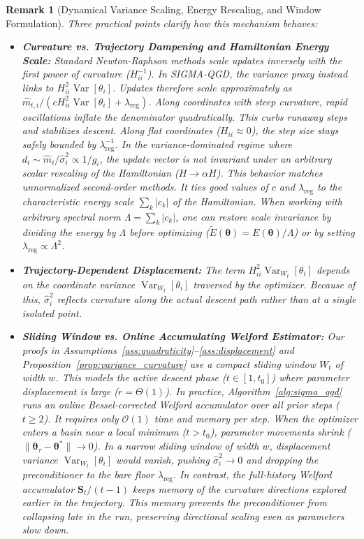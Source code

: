 \documentclass[11pt,a4paper]{article}
\newtheorem{remark}{Remark}
\begin{document}
\begin{remark}[Dynamical Variance Scaling, Energy Rescaling, and Window Formulation]
\label{rem:variance_scaling}
Three practical points clarify how this mechanism behaves:
\begin{itemize}
    \item \textbf{Curvature vs. Trajectory Dampening and Hamiltonian Energy Scale:} Standard Newton-Raphson methods scale updates inversely with the first power of curvature ($H_{ii}^{-1}$). In SIGMA-QGD, the variance proxy instead links to $H_{ii}^2 \operatorname{Var}[\theta_i]$. Updates therefore scale approximately as $\hat{m}_{t,i} / (c H_{ii}^2 \operatorname{Var}[\theta_i] + \lambda_{\text{reg}})$. Along coordinates with steep curvature, rapid oscillations inflate the denominator quadratically. This curbs runaway steps and stabilizes descent. Along flat coordinates ($H_{ii} \approx 0$), the step size stays safely bounded by $\lambda_{\text{reg}}^{-1}$. In the variance-dominated regime where $d_i \sim \hat{m}_i / \hat{\sigma}_i^2 \propto 1/g_i$, the update vector is not invariant under an arbitrary scalar rescaling of the Hamiltonian ($H \to \alpha H$). This behavior matches unnormalized second-order methods. It ties good values of $c$ and $\lambda_{\text{reg}}$ to the characteristic energy scale $\sum_k |c_k|$ of the Hamiltonian. When working with arbitrary spectral norm $\Lambda = \sum_k |c_k|$, one can restore scale invariance by dividing the energy by $\Lambda$ before optimizing ($\tilde{E}(\boldsymbol{\theta}) = E(\boldsymbol{\theta}) / \Lambda$) or by setting $\lambda_{\text{reg}} \propto \Lambda^2$.
    \item \textbf{Trajectory-Dependent Displacement:} The term $H_{ii}^2 \operatorname{Var}_{W_t}[\theta_i]$ depends on the coordinate variance $\operatorname{Var}_{W_t}[\theta_i]$ traversed by the optimizer. Because of this, $\hat{\sigma}_i^2$ reflects curvature along the actual descent path rather than at a single isolated point.
    \item \textbf{Sliding Window vs. Online Accumulating Welford Estimator:} Our proofs in Assumptions~\ref{ass:quadraticity}--\ref{ass:displacement} and Proposition~\ref{prop:variance_curvature} use a compact sliding window $W_t$ of width $w$. This models the active descent phase ($t \in [1, t_0]$) where parameter displacement is large ($r = \Theta(1)$). In practice, Algorithm~\ref{alg:sigma_qgd} runs an online Bessel-corrected Welford accumulator over all prior steps ($t \ge 2$). It requires only $\mathcal{O}(1)$ time and memory per step. When the optimizer enters a basin near a local minimum ($t > t_0$), parameter movements shrink ($\|\boldsymbol{\theta}_\tau - \boldsymbol{\theta}^*\| \to 0$). In a narrow sliding window of width $w$, displacement variance $\operatorname{Var}_{W_t}[\theta_i]$ would vanish, pushing $\hat{\sigma}_i^2 \to 0$ and dropping the preconditioner to the bare floor $\lambda_{\text{reg}}$. In contrast, the full-history Welford accumulator $\mathbf{S}_t / (t-1)$ keeps memory of the curvature directions explored earlier in the trajectory. This memory prevents the preconditioner from collapsing late in the run, preserving directional scaling even as parameters slow down.

\end{itemize}
\end{remark}
\end{document}
